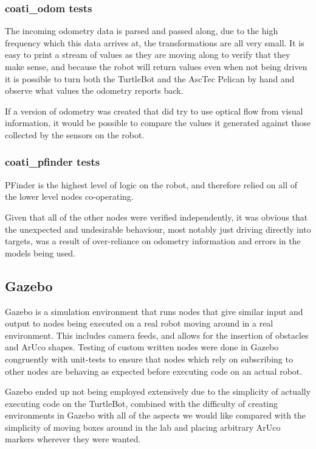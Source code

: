 \documentclass{article}[12]
\begin{document}
	\subsubsection{coati\_odom tests}
	
	The incoming odometry data is parsed and passed along, due to the high frequency which this data arrives at, the transformations are all very small. It is easy to print a stream of values as they are moving along to verify that they make sense, and because the robot will return values even when not being driven it is possible to turn both the TurtleBot and the AscTec Pelican by hand and observe what values the odometry reports back.
	
	If a version of odometry was created that did try to use optical flow from visual information, it would be possible to compare the values it generated against those collected by the sensors on the robot.
	
	\subsubsection{coati\_pfinder tests}
	
	PFinder is the highest level of logic on the robot, and therefore relied on all of the lower level nodes co-operating. 
	
	Given that all of the other nodes were verified independently, it was obvious that the unexpected and undesirable behaviour, most notably just driving directly into targets, was a result of over-reliance on odometry information and errors in the models being used. 
	
	\subsection{Gazebo}
	
	Gazebo is a simulation environment that runs nodes that give similar input and output to nodes being executed on a real robot moving around in a real environment. This includes camera feeds, and allows for the insertion of obstacles and ArUco shapes. Testing of custom written nodes were done in Gazebo congruently with unit-tests to ensure that nodes which rely on subscribing to other nodes are behaving as expected before executing code on an actual robot.
	
	Gazebo ended up not being employed extensively due to the simplicity of actually executing code on the TurtleBot, combined with the difficulty of creating environments in Gazebo with all of the aspects we would like compared with the simplicity of moving boxes around in the lab and placing arbitrary ArUco markers wherever they were wanted.
	
\end{document}
